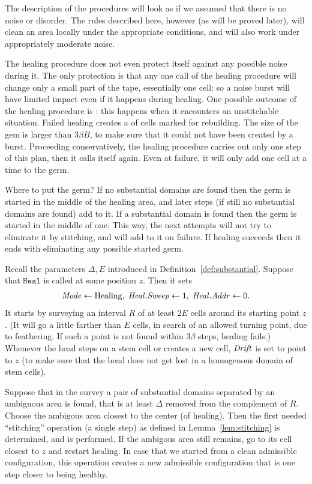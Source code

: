 \documentclass[11pt]{memoir}
\theoremstyle{definition} %
\newcommand{\fld}[1]{\ensuremath{\textit{#1\/}}}
\newcommand{\rul}[1]{\ensuremath{\texttt{#1}}}
\def\B{B}
\newcommand{\E}{E}
\newcommand{\R}{R}
\newcommand{\z}{z}
\newcommand{\Addr}{\fld{Addr}}
\newcommand{\Drift}{\fld{Drift}}
\newcommand{\Mode}{\fld{Mode}}
\newcommand{\Heal}{\fld{Heal}}
\newcommand{\rHeal}{\rul{Heal}}
\newcommand{\Sweep}{\fld{Sweep}}
\newcommand{\Healing}{\mathrm{Healing}}
\begin{document}
The description of the procedures will look as if we assumed that there is no noise or disorder.
The rules described here, however (as will be proved later), will clean an area locally under the 
appropriate conditions, and will also work under appropriately moderate noise.

The healing procedure does not even protect itself against any possible noise during it.
The only protection is that any one call of the healing procedure will change only 
a small part of the tape, essentially one cell: so a noise burst will have limited impact even if it
happens during healing.
One possible outcome of the healing procedure is : this happens when it encounters
an  unstitchable situation.
Failed healing creates a  of cells marked for rebuilding.
The size of the gem is larger than \( 3\beta\B \), to make sure that it could not have
been created by a burst.
Proceeding conservatively,
the healing procedure carries  out only one step of this plan, then it calls itself again.
Even at failure, it will only add one cell at a time to the germ.

Where to put the germ?
If no substantial domains are found then the germ is started in the middle of the healing area,
and later steps (if still no substantial domains are found) add to it.
If a substantial domain is found then the germ is started in the middle of one.
This way, the next attempts will not try to eliminate it by stitching, and will add to it on failure.
If healing succeeds then it ends with eliminating any possible started germ.

Recall the parameters \( \Delta,\E \) introduced in Definition~\ref{def:substantial}.
Suppose that \( \rHeal \) is called at some position \( \z \).
Then it sets
\begin{align*}
\Mode\gets\Healing,\; \Heal.\Sweep \gets 1,\; \Heal.\Addr \gets 0.
 \end{align*} 
It starts by surveying an interval \( \R \) of at least \( 2\E \) cells 
around its starting point \( z \).
(It will go a little farther than \( \E \) cells, in search of an allowed turning point, due to feathering.
If such a point is not found within \( 3\beta \) steps, healing fails.)
Whenever the head steps on a stem cell or creates a new cell, 
\( \Drift \) is set to point to \( \z \) (to make sure that the head does not get
lost in a homogenous domain of stem cells).

Suppose that in the survey a pair of substantial domains separated by an ambiguous area is found,
that is at least \( \Delta \) removed from the complement of \( R \). 
Choose the ambigous area closest to the center (of healing).
Then the first needed ``stitching'' operation (a single step) as defined in Lemma~\ref{lem:stitching}
is determined, and is performed.
If the ambigous area still remains, go to its cell closest to \( z \) and restart healing.
 In case that we started from a clean admissible configuration, this operation creates a new admissible
configuration that is one step closer to being healthy.
\end{document}
